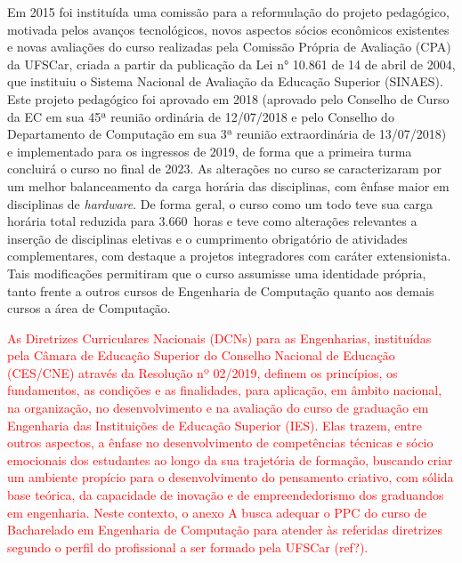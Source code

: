 Em 2015 foi instituída uma comissão para a reformulação do projeto pedagógico, motivada pelos avanços tecnológicos, novos aspectos sócios econômicos existentes e novas avaliações do curso realizadas pela Comissão Própria de Avaliação (CPA) da UFSCar, criada a partir da publicação da Lei n° 10.861 de 14 de abril de 2004, que instituiu o Sistema Nacional de Avaliação da Educação Superior (SINAES). Este projeto pedagógico foi aprovado em 2018 (aprovado pelo Conselho de Curso da EC em sua 45ª reunião ordinária de 12/07/2018 e pelo Conselho do Departamento de Computação em sua 3ª reunião extraordinária de 13/07/2018) e implementado para os ingressos de 2019, de forma que a primeira turma concluirá o curso no final de 2023. As alterações no curso se caracterizaram por um melhor balanceamento da carga horária das disciplinas, com ênfase maior em disciplinas de \textit{hardware}. De forma geral, o curso como um todo teve sua carga horária total reduzida para 3.660~horas e teve como alterações relevantes a inserção de disciplinas eletivas e o cumprimento obrigatório de atividades complementares, com destaque a projetos integradores com caráter extensionista. Tais modificações permitiram que o curso assumisse uma identidade própria, tanto frente a outros cursos de Engenharia de Computação quanto aos demais cursos a área de Computação. 


\textcolor{red}{As Diretrizes Curriculares Nacionais (DCNs) para as Engenharias, instituídas pela Câmara de Educação Superior do Conselho Nacional de Educação (CES/CNE) através da Resolução nº 02/2019, definem os princípios, os fundamentos, as condições e as finalidades, para aplicação, em âmbito nacional, na organização, no desenvolvimento e na avaliação do curso de graduação em Engenharia das Instituições de Educação Superior (IES). Elas trazem, entre outros aspectos, a ênfase no desenvolvimento de competências técnicas e sócio emocionais dos estudantes ao longo da sua trajetória de formação, buscando criar um ambiente propício para o desenvolvimento do pensamento criativo, com sólida base teórica, da capacidade de inovação e de empreendedorismo dos graduandos em engenharia. Neste contexto, o anexo A busca adequar o PPC do curso de Bacharelado em Engenharia de Computação para atender às referidas diretrizes segundo o perfil do profissional a ser formado pela UFSCar (ref?).}  %

